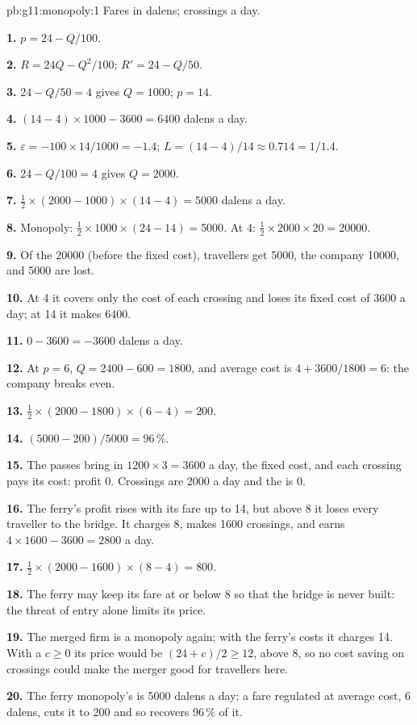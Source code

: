 \begin{solution}{pb:g11:monopoly:1}
Fares in dalens; crossings a day.

\textbf{1.} $p = 24 - Q/100$.

\textbf{2.} $R = 24Q - Q^2/100$; $R' = 24 - Q/50$.

\textbf{3.} $24 - Q/50 = 4$ gives $Q = 1000$; $p = 14$.

\textbf{4.} $(14 - 4) \times 1000 - 3600 = 6400$ dalens a day.

\textbf{5.} $\varepsilon = -100 \times 14/1000 = -1.4$; $L = (14 - 4)/14 \approx 0.714 = 1/1.4$.

\textbf{6.} $24 - Q/100 = 4$ gives $Q = 2000$.

\textbf{7.} $\tfrac12 \times (2000 - 1000) \times (14 - 4) = 5000$ dalens a day.

\textbf{8.} Monopoly: $\tfrac12 \times 1000 \times (24 - 14) = 5000$. At 4: $\tfrac12 \times 2000 \times 20 = 20000$.

\textbf{9.} Of the 20000 (before the fixed cost), travellers get 5000, the company 10000, and 5000 are lost.

\textbf{10.} At 4 it covers only the cost of each crossing and loses its fixed cost of 3600 a day; at 14 it makes 6400.

\textbf{11.} $0 - 3600 = -3600$ dalens a day.

\textbf{12.} At $p = 6$, $Q = 2400 - 600 = 1800$, and average cost is $4 + 3600/1800 = 6$: the company breaks even.

\textbf{13.} $\tfrac12 \times (2000 - 1800) \times (6 - 4) = 200$.

\textbf{14.} $(5000 - 200)/5000 = 96\,\%$.

\textbf{15.} The passes bring in $1200 \times 3 = 3600$ a day, the fixed cost, and each crossing pays its cost: profit 0. Crossings are 2000 a day and the  is 0.

\textbf{16.} The ferry's profit rises with its fare up to 14, but above 8 it loses every traveller to the bridge. It charges 8, makes 1600 crossings, and earns $4 \times 1600 - 3600 =
2800$ a day.

\textbf{17.} $\tfrac12 \times (2000 - 1600) \times (8 - 4) = 800$.

\textbf{18.} The ferry may keep its fare at or below 8 so that the bridge is never built: the threat of entry alone limits its price.

\textbf{19.} The merged firm is a monopoly again; with the ferry's costs it charges 14. With a  $c \geq 0$ its price would be $(24 + c)/2 \geq 12$, above 8, so no cost
saving on crossings could make the merger good for travellers here.

\textbf{20.} The ferry monopoly's  is 5000 dalens a day; a fare regulated at average cost, 6 dalens, cuts it to 200 and so recovers 96\,\% of it.
\end{solution}
